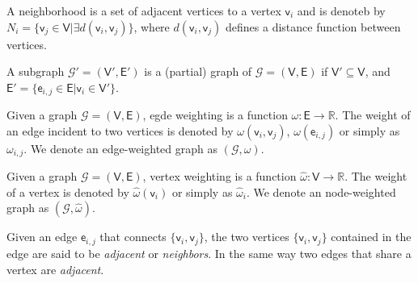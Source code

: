 \begin{definition}[Neighborhood]
	A neighborhood is a set of adjacent vertices to a vertex $\mathsf{v}_i$ and is denoteb by $N_i = \{\mathsf{v}_j \in \mathsf{V}  | \exists d(\mathsf{v}_i, \mathsf{v}_j)\}$, where $d(\mathsf{v}_i, \mathsf{v}_j)$ defines a distance function between vertices.
\end{definition}

\begin{definition}[Subgraph]
	A subgraph $\mathcal{G}'= (\mathsf{V}', \mathsf{E}')$ is a (partial) graph of $\mathcal{G}=(\mathsf{V}, \mathsf{E})$ if $\mathsf{V}' \subseteq \mathsf{V}$, and  $\mathsf{E}'= \{\mathsf{e}_{i,j} \in \mathsf{E} | \mathsf{v}_i \in \mathsf{V}' \}$.
\end{definition}

\begin{definition}
	Given a graph $\mathcal{G}=(\mathsf{V}, \mathsf{E})$, egde weighting is a function $\omega: \mathsf{E} \rightarrow \mathbb{R}$. The weight of an edge incident to two vertices is denoted by  $\omega(\mathsf{v}_{i}, \mathsf{v}_{j})$, $ \omega(\mathsf{e}_{i,j})$ or simply as $\omega_{i,j}$. We denote an edge-weighted graph as $(\mathcal{G}, \omega)$.
\end{definition}

\begin{definition}
	Given a graph $\mathcal{G}=(\mathsf{V}, \mathsf{E})$, vertex weighting is a function $\hat{\omega}: \mathsf{V} \rightarrow \mathbb{R}$. The weight of a vertex is denoted by  $\hat{\omega}(\mathsf{v}_{i})$ or simply as $\hat{\omega}_{i}$. We denote an node-weighted graph as $(\mathcal{G}, \hat{\omega})$.
\end{definition}

\begin{definition}[Adjacency]
	Given an edge $\mathsf{e}_{i,j}$ that connects $\{\mathsf{v}_{i}, \mathsf{v}_{j}\} $, the two vertices $\{\mathsf{v}_{i}, \mathsf{v}_{j}\}$ contained in the edge are said to be \textit{adjacent} or \textit{neighbors}. In the same way two edges that share a vertex are \textit{adjacent}.
\end{definition}

